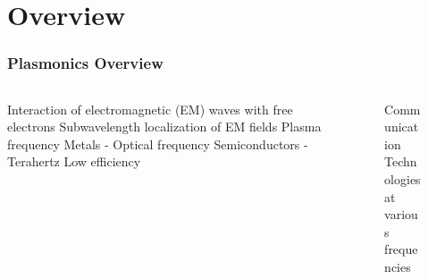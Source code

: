 \documentclass[mathserif,16pt,xcolor=table]{beamer}
\begin{document}
\section{Overview}
\begin{frame}
  \frametitle{Plasmonics Overview}
  \begin{columns} %
    \begin{column}{.5\textwidth} \vspace*{-1cm}
      \begin{outline}[itemize]
        \1 Interaction of electromagnetic (EM) waves with free electrons
        \1 Subwavelength localization of EM fields
        \1 Plasma frequency
          \2 Metals - Optical frequency
          \2 Semiconductors - Terahertz
        \1 Low efficiency
      \end{outline}
    \end{column}
    \begin{column}{.5\textwidth}
      \begin{figure}[t!]
        \centering \vspace*{-1.5cm} \hspace*{-0.5cm}
        {\scalebox{.45}{}
        \label{fig:struct}}
        \caption{Communication Technologies at various frequencies}
      \end{figure}
      \end{column}%
    \end{columns}
  \end{frame}
\end{document}
